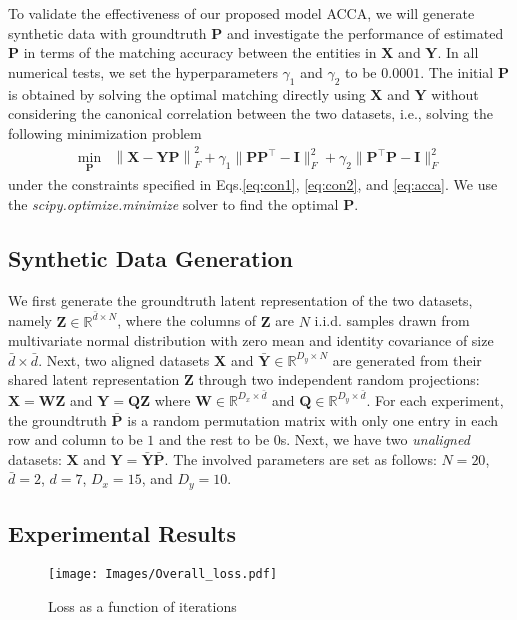To validate the effectiveness of our proposed model ACCA, we will generate synthetic data with groundtruth $\mathbf{P}$ and investigate the performance of estimated $\mathbf{P}$ in terms of the matching accuracy between the entities in $\mathbf{X}$ and $\mathbf{Y}$. In all numerical tests, we set the hyperparameters $\gamma_1$ and $\gamma_2$ to be $0.0001$. The initial $\mathbf{P}$ is obtained by solving the optimal matching directly using $\mathbf{X}$ and $\mathbf{Y}$ without considering the canonical correlation between the two datasets, i.e., solving the following minimization problem 
\begin{align}
\min_{\mathbf{P}}   & \left \|{\mathbf{X}} -\mathbf{YP}\right\|_F^2 +\gamma_1\|\mathbf{P}\mathbf{P}^\top -\mathbf{I}\|_F^2+\gamma_2\|\mathbf{P}^\top\mathbf{P} -\mathbf{I}\|_F^2\label{eq:initialp}
\end{align}
\noindent under the constraints specified in Eqs.\eqref{eq:con1}, \eqref{eq:con2}, and \eqref{eq:acca}. We use the \emph{scipy.optimize.minimize}  solver to find the optimal $\mathbf{P}$.

\subsection{Synthetic Data Generation}
\label{sec-Datasets}
We first generate the groundtruth latent representation of the two datasets, namely $\mathbf{Z}\in\mathbb{R}^{\bar{d}\times N}$, where the columns of $\mathbf{Z}$ are  $N$  i.i.d. samples drawn from  multivariate normal distribution with zero mean and identity covariance  of size $\bar{d}\times\bar{d} $. Next, two aligned datasets $\mathbf{X}$ and $\bar{\mathbf{Y}}\in\mathbb{R}^{D_y\times N}$ are generated from their shared latent representation $\mathbf{Z}$ through two independent random projections: $\mathbf{X}=\mathbf{W} \mathbf{Z} $ and $\mathbf{Y}=\mathbf{Q}\mathbf{Z} $ where $\mathbf{W}\in\mathbb{R}^{D_x \times \bar{d}}$ and $\mathbf{Q}\in\mathbb{R}^{D_y \times \bar{d}}$. For each experiment, the groundtruth $\bar{\mathbf{P}}$ is a random permutation matrix with only one entry in each row and column to be $1$ and the rest to be $0$s. Next, we have two \emph{unaligned} datasets: $\mathbf{X}$ and $\mathbf{Y}=\bar{\mathbf{Y}}\bar{\mathbf{P}}$. The involved parameters are set as follows: $N=20$, $\bar{d}=2$, $d=7$, $D_x=15$, and $D_y=10$.


\subsection{Experimental Results}
\label{sec-Results}
\begin{figure}[!htp]
  \texttt{[image: Images/Overall\_loss.pdf]}
  \caption{Loss as a function of iterations}
  \label{fig:loss}
\end{figure}

